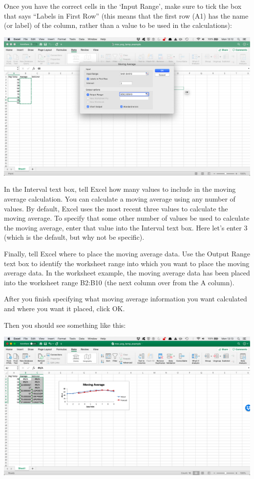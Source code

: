 \documentclass[
]{book}
\begin{document}
Once you have the correct cells in the `Input Range', make sure to tick the box that says ``Labels in First Row'' (this means that the first row (A1) has the name (or label) of the column, rather than a value to be used in the calculations):

\includegraphics{imgs/mov_av_1.png}

In the Interval text box, tell Excel how many values to include in the moving average calculation.
You can calculate a moving average using any number of values. By default, Excel uses the most recent three values to calculate the moving average. To specify that some other number of values be used to calculate the moving average, enter that value into the Interval text box. Here let's enter 3 (which is the default, but why not be specific).

Finally, tell Excel where to place the moving average data. Use the Output Range text box to identify the worksheet range into which you want to place the moving average data. In the worksheet example, the moving average data has been placed into the worksheet range B2:B10 (the next column over from the A column).

After you finish specifying what moving average information you want calculated and where you want it placed, click OK.

Then you should see something like this:

\includegraphics{imgs/mov_av_2.png}
\end{document}
